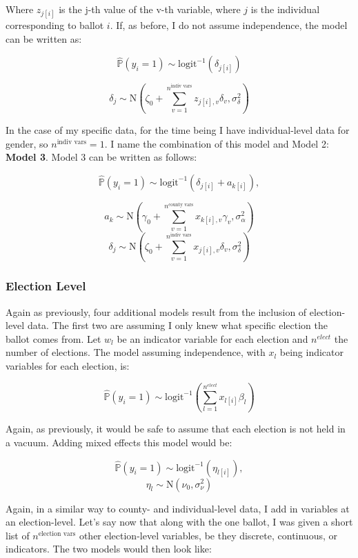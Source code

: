 \documentclass[12pt,twoside]{reedthesis}
\begin{document}
  Where \(z_{j[i]}\) is the j-th value of the v-th variable, where \(j\)
  is the individual corresponding to ballot \(i\). If, as before, I do not
  assume independence, the model can be written as:
  
  \[\hat{\mathbb{P}}(y_i = 1) \sim \text{logit}^{-1}(\delta_{j[i]})\]
  
  \[\delta_{j} \sim \text{N}(\zeta_0 + \sum_{v=1}^{n^{\text{indiv vars}}}z_{j[i], v}\delta_{v}, \sigma_{\delta}^2)\]
  
  In the case of my specific data, for the time being I have
  individual-level data for gender, so \(n^{\text{indiv vars}} = 1\). I
  name the combination of this model and Model 2: \textbf{Model 3}. Model
  3 can be written as follows:
  
  \begin{equation} \tag{Model 3}
  \hat{\mathbb{P}}(y_i = 1) \sim \text{logit}^{-1}(\delta_{j[i]} + a_{k[i]}), 
  \end{equation}
  
  \[a_{k} \sim \text{N}(\gamma_0 + \sum_{v=1}^{n^{\text{county vars}}}x_{k[i], v}\gamma_{v}, \sigma_{\alpha}^2)\]
  \[\delta_{j} \sim \text{N}(\zeta_0 + \sum_{v=1}^{n^{\text{indiv vars}}}x_{j[i], v}\delta_{v}, \sigma_{\delta}^2)\]
  
  \subsubsection{Election Level}\label{election-level}
  
  Again as previously, four additional models result from the inclusion of
  election-level data. The first two are assuming I only knew what
  specific election the ballot comes from. Let \(w_{l}\) be an indicator
  variable for each election and \(n^{elect}\) the number of elections.
  The model assuming independence, with \(x_{l}\) being indicator
  variables for each election, is:
  
  \[\hat{\mathbb{P}}(y_i = 1) \sim \text{logit}^{-1}(\sum_{l = 1}^{n^{elect}}x_{l[i]}\beta_{l})\]
  
  Again, as previously, it would be safe to assume that each election is
  not held in a vacuum. Adding mixed effects this model would be:
  
  \[\hat{\mathbb{P}}(y_i = 1) \sim \text{logit}^{-1}(\eta_{l[i]}), \]
  \[\eta_{l} \sim \text{N}(\nu_0, \sigma_{\nu}^2)\]
  
  Again, in a similar way to county- and individual-level data, I add in
  variables at an election-level. Let's say now that along with the one
  ballot, I was given a short list of \(n^{\text{election vars}}\) other
  election-level variables, be they discrete, continuous, or indicators.
  The two models would then look like:
  
\end{document}
